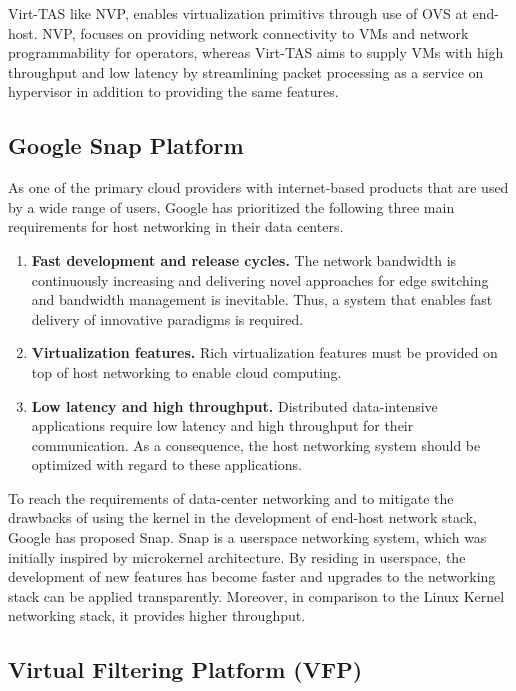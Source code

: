 Virt-TAS like NVP, enables virtualization primitivs through use of OVS at end-host. 
NVP, focuses on providing network connectivity to VMs and network programmability 
for operators, whereas Virt-TAS aims to supply VMs with high throughput and low latency 
by streamlining packet processing as a service on hypervisor in addition to providing 
the same features.


\subsection{Google Snap Platform}
\label{snap}

As one of the primary cloud providers with internet-based products that are used by a wide 
range of users, Google has prioritized the following three main requirements for host 
networking in their data centers. 

\begin{enumerate}
    \item \textbf{Fast development and release cycles.} The network bandwidth is continuously 
    increasing and delivering novel approaches for edge switching and bandwidth management is 
    inevitable. Thus, a system that enables fast delivery of innovative paradigms is required.

    \item \textbf{Virtualization features.} Rich virtualization features must be provided on 
    top of host networking to enable cloud computing.

    \item \textbf{Low latency and high throughput.} Distributed data-intensive applications 
    require low latency and high throughput for their communication. As a consequence, the 
    host networking system should be optimized with regard to these applications.

\end{enumerate}

To reach the requirements of data-center networking and to mitigate the drawbacks of using 
the kernel in the development of end-host network stack, Google has proposed Snap. Snap is 
a userspace networking system, which was initially inspired by microkernel architecture. 
By residing in userspace, the development of new features has become faster and upgrades to
the networking stack can be applied transparently. Moreover, in comparison to the Linux Kernel 
networking stack, it provides higher throughput.

\subsection{Virtual Filtering Platform (VFP)}
\label{vfp}


